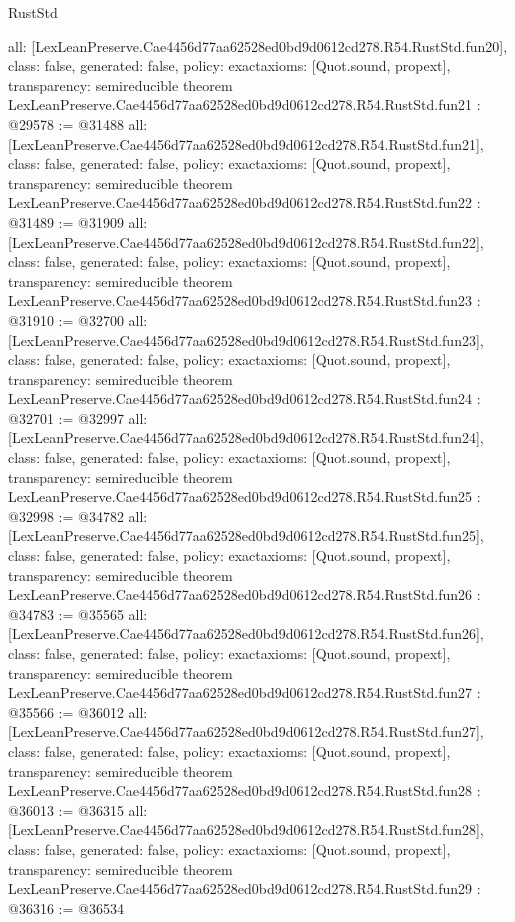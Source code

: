 \begin{lexlean}{RustStd}
\begin{coremodule}
{  all: [LexLeanPreserve.Cae4456d77aa62528ed0bd9d0612cd278.R54.RustStd.fun20],
  class: false,
  generated: false,
  policy: exact{axioms: [Quot.sound, propext]},
  transparency: semireducible
}
theorem LexLeanPreserve.Cae4456d77aa62528ed0bd9d0612cd278.R54.RustStd.fun21 : @29578 := @31488 {
  all: [LexLeanPreserve.Cae4456d77aa62528ed0bd9d0612cd278.R54.RustStd.fun21],
  class: false,
  generated: false,
  policy: exact{axioms: [Quot.sound, propext]},
  transparency: semireducible
}
theorem LexLeanPreserve.Cae4456d77aa62528ed0bd9d0612cd278.R54.RustStd.fun22 : @31489 := @31909 {
  all: [LexLeanPreserve.Cae4456d77aa62528ed0bd9d0612cd278.R54.RustStd.fun22],
  class: false,
  generated: false,
  policy: exact{axioms: [Quot.sound, propext]},
  transparency: semireducible
}
theorem LexLeanPreserve.Cae4456d77aa62528ed0bd9d0612cd278.R54.RustStd.fun23 : @31910 := @32700 {
  all: [LexLeanPreserve.Cae4456d77aa62528ed0bd9d0612cd278.R54.RustStd.fun23],
  class: false,
  generated: false,
  policy: exact{axioms: [Quot.sound, propext]},
  transparency: semireducible
}
theorem LexLeanPreserve.Cae4456d77aa62528ed0bd9d0612cd278.R54.RustStd.fun24 : @32701 := @32997 {
  all: [LexLeanPreserve.Cae4456d77aa62528ed0bd9d0612cd278.R54.RustStd.fun24],
  class: false,
  generated: false,
  policy: exact{axioms: [Quot.sound, propext]},
  transparency: semireducible
}
theorem LexLeanPreserve.Cae4456d77aa62528ed0bd9d0612cd278.R54.RustStd.fun25 : @32998 := @34782 {
  all: [LexLeanPreserve.Cae4456d77aa62528ed0bd9d0612cd278.R54.RustStd.fun25],
  class: false,
  generated: false,
  policy: exact{axioms: [Quot.sound, propext]},
  transparency: semireducible
}
theorem LexLeanPreserve.Cae4456d77aa62528ed0bd9d0612cd278.R54.RustStd.fun26 : @34783 := @35565 {
  all: [LexLeanPreserve.Cae4456d77aa62528ed0bd9d0612cd278.R54.RustStd.fun26],
  class: false,
  generated: false,
  policy: exact{axioms: [Quot.sound, propext]},
  transparency: semireducible
}
theorem LexLeanPreserve.Cae4456d77aa62528ed0bd9d0612cd278.R54.RustStd.fun27 : @35566 := @36012 {
  all: [LexLeanPreserve.Cae4456d77aa62528ed0bd9d0612cd278.R54.RustStd.fun27],
  class: false,
  generated: false,
  policy: exact{axioms: [Quot.sound, propext]},
  transparency: semireducible
}
theorem LexLeanPreserve.Cae4456d77aa62528ed0bd9d0612cd278.R54.RustStd.fun28 : @36013 := @36315 {
  all: [LexLeanPreserve.Cae4456d77aa62528ed0bd9d0612cd278.R54.RustStd.fun28],
  class: false,
  generated: false,
  policy: exact{axioms: [Quot.sound, propext]},
  transparency: semireducible
}
theorem LexLeanPreserve.Cae4456d77aa62528ed0bd9d0612cd278.R54.RustStd.fun29 : @36316 := @36534 {
}
\end{coremodule}
\end{lexlean}
